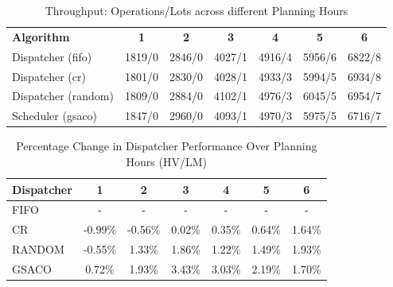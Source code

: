\begin{table}[t]
	\caption{Throughput: Operations/Lots across different Planning Hours} \label{tab:my_label} \centering
	\begin{tabular}{|l|c|c|c|c|c|c|}
		\hline
		\textbf{Algorithm} & \textbf{1} & \textbf{2} & \textbf{3} & \textbf{4} & \textbf{5} & \textbf{6} \\ \cline{1-7} 
		Dispatcher (fifo)   & 1819/0 & 2846/0 & 4027/1 & 4916/4 & 5956/6 & 6822/8 \\
		Dispatcher (cr)     & 1801/0 & 2830/0 & 4028/1 & 4933/3 & 5994/5 & 6934/8 \\
		Dispatcher (random) & 1809/0 & 2884/0 & 4102/1 & 4976/3 & 6045/5 & 6954/7 \\
		Scheduler (gsaco)   & 1847/0 & 2960/0 & 4093/1 & 4970/3 & 5975/5 & 6716/7 \\
		\hline 
	\end{tabular}
\end{table}


\begin{table}[t]
	\caption{Percentage Change in Dispatcher Performance Over Planning Hours (HV/LM)} \label{tab:dispatchers} \centering
	\begin{tabular}{|l|c|c|c|c|c|c|}
		\hline
		\textbf{Dispatcher} & \textbf{1} & \textbf{2} & \textbf{3} & \textbf{4} & \textbf{5} & \textbf{6} \\
		\hline 
		FIFO     & -    & -    & -    & -    & -    & -    \\
		CR       & -0.99\% & -0.56\% & 0.02\% & 0.35\% & 0.64\% & 1.64\% \\
		RANDOM   & -0.55\% & 1.33\% & 1.86\% & 1.22\% & 1.49\% & 1.93\% \\
		GSACO    & 0.72\% & 1.93\% & 3.43\% & 3.03\% & 2.19\% & 1.70\% \\
		\hline
	\end{tabular}
\end{table}

